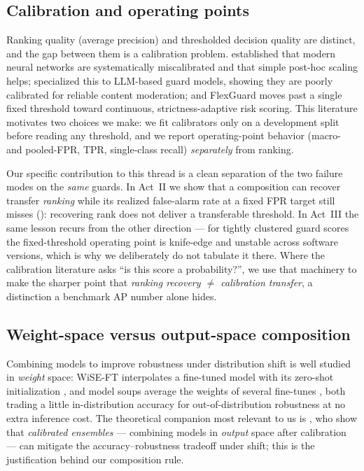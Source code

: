 \subsection{Calibration and operating points}
\label{sec:related-calibration}
Ranking quality (average precision) and thresholded decision quality are distinct, and the gap between
them is a calibration problem. \citet{guo2017calibration} established that modern neural networks are
systematically miscalibrated and that simple post-hoc scaling helps; \citet{liu2025calibration}
specialized this to LLM-based guard models, showing they are poorly calibrated for reliable content
moderation; and FlexGuard \citep{flexguard2026} moves past a single fixed threshold toward continuous,
strictness-adaptive risk scoring. This literature motivates two choices we make: we fit calibrators only
on a development split before reading any threshold, and we report operating-point behavior (macro- and
pooled-FPR, TPR, single-class recall) \emph{separately} from ranking.

Our specific contribution to this thread is a clean separation of the two failure modes on the \emph{same}
guards. In Act~II we show that a composition can recover transfer \emph{ranking} while its realized
false-alarm rate at a fixed FPR target still misses (): recovering rank does
not deliver a transferable threshold. In Act~III the same lesson recurs from the other direction --- for
tightly clustered guard scores the fixed-threshold operating point is knife-edge and unstable across
software versions, which is why we deliberately do not tabulate it there. Where the calibration
literature asks ``is this score a probability?'', we use that machinery to make the sharper point that
\emph{ranking recovery $\neq$ calibration transfer}, a distinction a benchmark AP number alone hides.

\subsection{Weight-space versus output-space composition}
\label{sec:related-composition}
Combining models to improve robustness under distribution shift is well studied in \emph{weight} space:
WiSE-FT interpolates a fine-tuned model with its zero-shot initialization \citep{wortsman2022wiseft},
and model soups average the weights of several fine-tunes \citep{wortsman2022modelsoups}, both trading a
little in-distribution accuracy for out-of-distribution robustness at no extra inference cost. The
theoretical companion most relevant to us is \citet{kumar2022calibrated}, who show that \emph{calibrated
ensembles} --- combining models in \emph{output} space after calibration --- can mitigate the
accuracy--robustness tradeoff under shift; this is the justification behind our composition rule.

